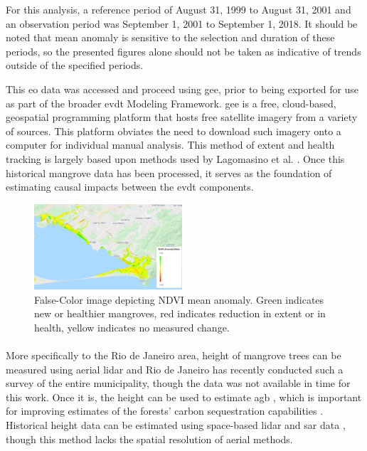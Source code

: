 For this analysis, a reference period of August 31, 1999 to August 31, 2001 and an observation period was September 1, 2001 to September 1, 2018. It should be noted that mean anomaly is sensitive to the selection and duration of these periods, so the presented figures alone should not be taken as indicative of trends outside of the specified periods. 

This \ac{eo} data was accessed and proceed using \ac{gee}, prior to being exported for use as part of the broader \ac{evdt} Modeling Framework. \ac{gee} is a free, cloud-based, geospatial programming platform that hosts free satellite imagery from a variety of sources. This platform obviates the need to download such imagery onto a computer for individual manual analysis. This method of extent and health tracking is largely based upon methods used by Lagomasino et al. \cite{zhangModelingRiskMangroves2019}. Once this historical mangrove data has been processed, it serves as the foundation of estimating causal impacts between the \ac{evdt} components.

\begin{figure}[H] 
\centering
\includegraphics[width=0.49\textwidth]{Figures/chap4/guaratiba_anomaly.png}
\caption[False-Color image depicting NDVI mean anomaly]{False-Color image depicting NDVI mean anomaly. Green indicates new or healthier mangroves, red indicates reduction in extent or in health, yellow indicates no measured change.}
\label{fig:anomaly}
\end{figure}

\paragraph{} \label{sec:rio-mangrove-height} \leavevmode\newline

More specifically to the Rio de Janeiro area, height of mangrove trees can be measured using aerial \ac{lidar} \cite{olagokeIndividualMangroveTree2015} and Rio de Janeiro has recently conducted such a survey of the entire municipality, though the data was not available in time for this work. Once it is, the height can be used to estimate \ac{agb} \cite{cloughAllometricRelationshipsEstimating1989, fatoyinboEstimatingMangroveAboveground2018}, which is important for improving estimates of the forests' carbon sequestration capabilities \cite{lagomasinoMeasuringMangroveCarbon2019}. Historical height data can be estimated using space-based \ac{lidar} and \ac{sar} data \cite{lagomasinoComparisonMangroveCanopy2016}, though this method lacks the spatial resolution of aerial methods.

